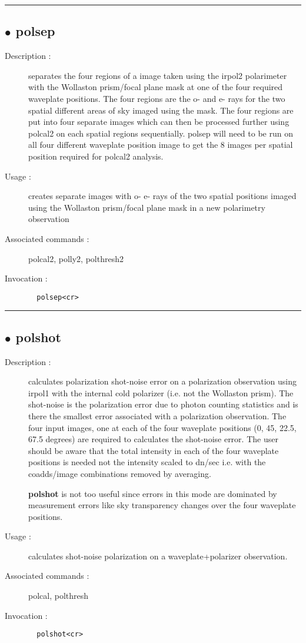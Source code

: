 \hrule \subsection*{$\bullet$ polsep}
\begin{description}
\item[Description :] separates the four regions of a image taken using the irpol2
polarimeter with the Wollaston prism/focal plane mask at one of the four
required waveplate positions.  The four regions are the o- and e- rays
for the two spatial different areas of sky imaged using the mask.  The
four regions are put into four separate images which can then be
processed further using polcal2 on each spatial regions sequentially.
polsep will need to be run on all four different waveplate position image
to get the 8 images per spatial position required for polcal2 analysis.
\item[Usage :] creates separate images with o- e- rays of the two spatial
positions imaged using the Wollaston prism/focal plane mask in a new
polarimetry observation
\item[Associated commands :] polcal2, polly2, polthresh2
\item[Invocation :]

\verb+  polsep<cr> +\end{description}

\hrule \subsection*{$\bullet$ polshot}
\begin{description}
\item[Description :] calculates polarization shot-noise error on a polarization
observation using irpol1 with the internal cold polarizer (i.e. not the
Wollaston prism).  The shot-noise is the polarization error due to photon
counting statistics and is there the smallest error associated with a
polarization observation.  The four input images, one at each of the four
waveplate positions (0, 45, 22.5, 67.5 degrees) are required to
calculates the shot-noise error.  The user should be aware that the total
intensity in each of the four waveplate positions is needed not the
intensity scaled to dn/sec i.e. with the coadds/image combinations
removed by averaging.

{\bf polshot} is not too useful since errors in this mode are dominated by
measurement errors like sky transparency changes over the four waveplate
positions.
\item[Usage :] calculates shot-noise polarization on a waveplate+polarizer
observation.
\item[Associated commands :] polcal, polthresh
\item[Invocation :]

\verb+  polshot<cr> +\end{description}

